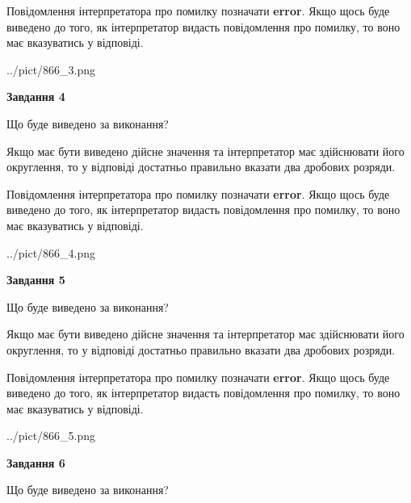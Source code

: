 \documentclass[12pt, ukrainian]{article}
\begin{document}
{\begin {Large}
Повідомлення інтерпретатора про помилку позначати \textbf{error}.
Якщо щось буде виведено до того, як інтерпретатор видасть повідомлення про помилку, 
то воно має вказуватись у відповіді. \par

\begin{center}
	{../pict/866_3.png}
\end{center}
\newpage

{\begin {center}\textbf{Завдання 4}\end {center}}\par
Що буде виведено за виконання? \par

Якщо має бути виведено дійсне значення та інтерпретатор має здійснювати його округлення, 
то у відповіді достатньо правильно вказати два дробових розряди.

Повідомлення інтерпретатора про помилку позначати \textbf{error}.
Якщо щось буде виведено до того, як інтерпретатор видасть повідомлення про помилку, 
то воно має вказуватись у відповіді. \par

\begin{center}
	{../pict/866_4.png}
\end{center}
\newpage

{\begin {center}\textbf{Завдання 5}\end {center}}\par
Що буде виведено за виконання? \par

Якщо має бути виведено дійсне значення та інтерпретатор має здійснювати його округлення, 
то у відповіді достатньо правильно вказати два дробових розряди.

Повідомлення інтерпретатора про помилку позначати \textbf{error}.
Якщо щось буде виведено до того, як інтерпретатор видасть повідомлення про помилку, 
то воно має вказуватись у відповіді. \par

\begin{center}
	{../pict/866_5.png}
\end{center}
\newpage

{\begin {center}\textbf{Завдання 6}\end {center}}\par
Що буде виведено за виконання? \par


\end{Large}}
\end{document}
